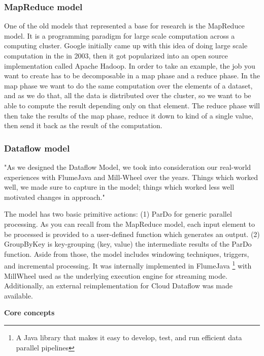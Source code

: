 \subsubsection{MapReduce model}

One of the old models that represented a base for research is the MapReduce model. It is a programming paradigm for large scale computation across a computing cluster. Google initially came up with this idea of doing large scale computation in the \cite{TheMapReduceModel} in 2003, then it got popularized into an open source implementation called Apache Hadoop. In order to take an example, the job you want to create has to be decomposable in a map phase and a reduce phase. In the map phase we want to do the same computation over the elements of a dataset, and as we do that, all the data is distributed over the cluster, so we want to be able to compute the result depending only on that element. The reduce phase will then take the results of the map phase, reduce it down to kind of a single value, then send it back as the result of the computation. \cite{mapReduceComp}

\subsubsection{Dataflow model}

"As we designed the Dataflow Model, we took into consideration our real-world experiences with FlumeJava and Mill-Wheel over the years. Things which worked well, we made sure to capture in the model; things which worked less well motivated changes in approach." \cite{TheDataflowModel} 

The model has two basic primitive actions: (1) ParDo for generic parallel processing. As you can recall from the MapReduce model, each input element to be processed is provided to a user-defined function which generates an output. (2) GroupByKey is key-grouping (key, value) the intermediate results of the ParDo function. Aside from those, the model includes windowing techniques, triggers, and incremental processing. It was internally implemented in FlumeJava \footnote{A Java library that makes it easy to develop, test, and run efficient data parallel pipelines} with MillWheel used as the underlying execution engine for streaming mode. Additionally, an external reimplementation for Cloud Dataflow was made available.

\vspace{0.4cm}
\textbf{Core concepts}
\vspace{0.4cm}

